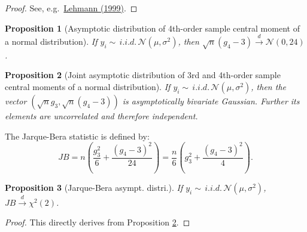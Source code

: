 \documentclass[
  12pt,
]{book}
\newtheorem{proposition}{Proposition}[chapter]
\theoremstyle{definition}
\theoremstyle{definition}
\theoremstyle{definition}
\theoremstyle{definition}
\theoremstyle{remark}
\begin{document}
\begin{proof}
See, e.g.~\href{http://www.springer.com/la/book/9780387985954}{Lehmann (1999)}.
\end{proof}

\begin{proposition}[Asymptotic distribution of 4th-order sample central moment of a normal distribution]
\protect\hypertarget{prp:Asymptg4Normal}{}\label{prp:Asymptg4Normal}If \(y_i\sim\,i.i.d.\,\mathcal{N}(\mu,\sigma^2)\), then \(\sqrt{n}(g_4-3) \overset{d}{\rightarrow} \mathcal{N}(0,24)\).
\end{proposition}

\begin{proposition}[Joint asymptotic distribution of 3rd and 4th-order sample central moments of a normal distribution]
\protect\hypertarget{prp:Asymptg3g4Normal}{}\label{prp:Asymptg3g4Normal}If \(y_i\sim\,i.i.d.\,\mathcal{N}(\mu,\sigma^2)\), then the vector \((\sqrt{n}g_3,\sqrt{n}(g_4-3))\) is asymptotically bivariate Gaussian. Further its elements are uncorrelated and therefore independent.
\end{proposition}

The Jarque-Bera statistic is defined by:
\[
JB = n \left( \frac{g_3^2}{6}+\frac{(g_4-3)^2}{24} \right) = \frac{n}{6}\left(g_3^2 + \frac{(g_4-3)^2}{4}\right).
\]

\begin{proposition}[Jarque-Bera asympt. distri.]
\protect\hypertarget{prp:JB}{}\label{prp:JB}If \(y_i\sim\,i.i.d.\,\mathcal{N}(\mu,\sigma^2)\), \(JB \overset{d}{\rightarrow} \chi^2(2)\).
\end{proposition}

\begin{proof}
This directly derives from Proposition \ref{prp:Asymptg3g4Normal}.
\end{proof}
\end{document}
